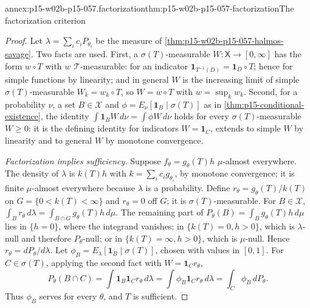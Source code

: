 \begin{annexitem}{annex:p15-w02b-p15-057.factorization}{thm:p15-w02b-p15-057-factorization}{The factorization criterion}
\begin{proof}
Let \(\lambda=\sum_ic_iP_{\theta_i}\) be the measure of
\cref{thm:p15-w02b-p15-057-halmos-savage}. Two facts are used. First,
a \(\sigma(T)\)-measurable \(W:\mathsf X\to[0,\infty]\) has the form
\(w\circ T\) with \(w\) \(\mathscr T\)-measurable: for an indicator
\(\mathbf1_{T^{-1}(D)}=\mathbf1_D\circ T\); hence for simple functions by
linearity; and in general \(W\) is the increasing limit of simple
\(\sigma(T)\)-measurable \(W_k=w_k\circ T\), so \(W=w\circ T\) with
\(w=\sup_kw_k\). Second, for a probability \(\nu\), a set
\(B\in\mathscr X\) and \(\phi=E_\nu[\mathbf1_B\mid\sigma(T)]\) as in
\cref{thm:p15-conditional-existence}, the identity
\(\int\mathbf1_BW\,d\nu=\int\phi W\,d\nu\) holds for every
\(\sigma(T)\)-measurable \(W\geq0\): it is the defining identity for
indicators \(W=\mathbf1_C\), extends to simple \(W\) by linearity and to
general \(W\) by monotone convergence.

\emph{Factorization implies sufficiency.} Suppose
\(f_\theta=g_\theta(T)h\) \(\mu\)-almost everywhere. The density of
\(\lambda\) is \(k(T)h\) with \(k=\sum_ic_ig_{\theta_i}\), by monotone
convergence; it is finite \(\mu\)-almost everywhere because \(\lambda\) is
a probability. Define \(r_\theta=g_\theta(T)/k(T)\) on
\(G=\{0<k(T)<\infty\}\) and \(r_\theta=0\) off \(G\); it is
\(\sigma(T)\)-measurable. For \(B\in\mathscr X\),
\(\int_Br_\theta\,d\lambda=\int_{B\cap G}g_\theta(T)h\,d\mu\). The
remaining part of \(P_\theta(B)=\int_Bg_\theta(T)h\,d\mu\) lies in
\(\{h=0\}\), where the integrand vanishes; in
\(\{k(T)=0,h>0\}\), which is \(\lambda\)-null and therefore
\(P_\theta\)-null; or in \(\{k(T)=\infty,h>0\}\), which is \(\mu\)-null.
Hence \(r_\theta=dP_\theta/d\lambda\). Let
\(\phi_B=E_\lambda[\mathbf1_B\mid\sigma(T)]\), chosen with values in
\([0,1]\). For \(C\in\sigma(T)\), applying the second fact with
\(W=\mathbf1_Cr_\theta\),
\[
 P_\theta(B\cap C)=\int\mathbf1_B\mathbf1_Cr_\theta\,d\lambda
 =\int\phi_B\mathbf1_Cr_\theta\,d\lambda=\int_C\phi_B\,dP_\theta .
\]
Thus \(\phi_B\) serves for every \(\theta\), and \(T\) is sufficient.


\end{proof}
\end{annexitem}
